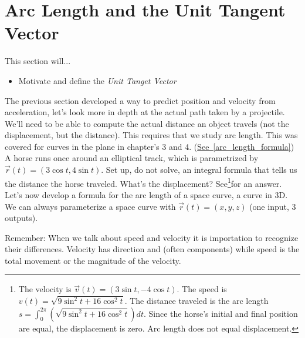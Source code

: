 \documentclass[10pt,]{book}
\theoremstyle{plain}
\theoremstyle{definition}
\theoremstyle{definition}
\theoremstyle{definition}
\theoremstyle{definition}
\theoremstyle{definition}
\numberwithin{equation}{section}
\newcommand{\ds}{\displaystyle}
\begin{document}
\section[{Arc Length and the Unit Tangent Vector}]{Arc Length and the Unit Tangent Vector}\label{section-25}
This section will... \leavevmode%
\begin{itemize}[label=\textbullet]
\item{}Motivate and define the \emph{Unit Tanget Vector}%
\end{itemize}
%
\par
The previous section developed a way to predict position and velocity from acceleration, let's look more in depth at the actual path taken by a projectile. We'll need to be able to compute the actual distance an object travels (not the displacement, but the distance). This requires that we study arc length. This was covered for curves in the plane in chapter's 3 and 4. (\hyperref[arc_length_formula]{See~\ref{arc_length_formula}})%
A horse runs once around an elliptical track, which is parametrized by \(\vec r(t) = (3\cos t,4\sin t)\). Set up, do not solve, an integral formula that tells us the distance the horse traveled. What's the displacement? See\footnote{The velocity is \(\vec v(t) = (3\sin t, -4\cos t)\). The speed is \(v(t) = \sqrt{9\sin^2t+16\cos^2t}\). The distance traveled is the arc length \(\ds s=\int_0^{2\pi} \left(\sqrt{9\sin^2t+16\cos^2t}\right)dt\). Since the horse's initial and final position are equal, the displacement is zero. Arc length does not equal displacement.\label{fn-8}}for an answer.%
Let's now develop a formula for the arc length of a space curve, a curve in 3D. We can always parameterize a space curve with \(\vec r(t) = (x,y,z)\) (one input, 3 outputs).%
\par
Remember: When we talk about speed and velocity it is importation to recognize their differences. Velocity has direction and (often components) while speed is the total movement or the magnitude of the velocity.%
\end{document}
